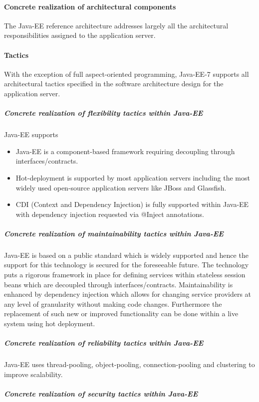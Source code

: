 \documentclass[a4paper,12pt]{report}
\begin{document}
\paragraph {Concrete realization of architectural components}
\hfill \break
The Java-EE reference architecture addresses largely all the architectural responsibilities assigned to the application server.

\paragraph {Tactics}
\hfill \break
With the exception of full aspect-oriented programming, Java-EE-7 supports all architectural tactics specified in the software architecture design for the application server.

\subparagraph {Concrete realization of flexibility tactics  within Java-EE}
\hfill \break
Java-EE supports
	\begin {itemize}
		\item Java-EE is a component-based framework requiring decoupling through interfaces/contracts.
		\item Hot-deployment is supported by most application servers including the most widely used
open-source application servers like JBoss and Glassfish.
		\item CDI (Context and Dependency Injection) is fully supported within Java-EE with dependency
injection requested via @Inject annotations.
	\end {itemize}

\subparagraph {Concrete realization of maintainability tactics  within Java-EE}
Java-EE is based on a public standard which is widely supported and hence the support for this technology is secured for the foreseeable future. The technology puts a rigorous framework in place for defining services within stateless session beans which are decoupled through interfaces/contracts. Maintainability is enhanced by dependency injection which allows for changing service providers at any level of granularity without making code changes. Furthermore the replacement of such new
or improved functionality can be done within a live system using hot deployment.

\subparagraph {Concrete realization of reliability tactics  within Java-EE}
\hfill \break
Java-EE uses thread-pooling, object-pooling, connection-pooling and clustering to improve scalability.

\subparagraph {Concrete realization of security tactics  within Java-EE}
\hfill \break
\end{document}
